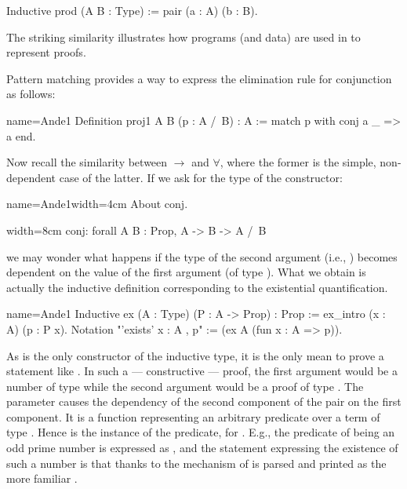 \begin{coq}{}{}
Inductive prod (A B : Type) := pair (a : A) (b : B).
\end{coq}
The striking similarity illustrates how programs (and data) are used in \Coq{}
to represent proofs.

Pattern matching provides a way to express the elimination rule for
conjunction as follows:

\begin{coq}{name=Ande1}{}
Definition proj1 A B (p : A /\ B) : A :=
  match p with conj a _ => a end.
\end{coq}

Now recall the similarity between $\to$ and $\forall$, where the former is the
simple, non-dependent case of the latter.  If we ask for the type of
the  constructor:

\begin{coq}{name=Ande1}{width=4cm}
About conj.
\end{coq}
\begin{coqout}{}{width=8cm}
conj: forall A B : Prop, A -> B -> A /\ B
\end{coqout}
we may wonder what happens if the type of the second argument (i.e., )
becomes dependent on the value of the first argument (of type ).
What we obtain is actually the inductive definition corresponding to the
existential quantification.

\begin{coq}{name=Ande1}{}
Inductive ex (A : Type) (P : A -> Prop) : Prop :=
  ex_intro (x : A) (p : P x).
Notation "'exists' x : A , p" := (ex A (fun x : A => p)).
\end{coq}

As   is the only constructor of the  inductive
type, it is the only mean to prove a statement like
.  In such a --- constructive --- proof, the first
argument would be a number
 of type  while the second argument would be a proof  of type
.  The parameter  causes the dependency of the
second component of the pair on the first component. It is a function
representing an arbitrary predicate over a term of
type .  Hence  is the instance of the predicate, for .  E.g.,
the predicate of being an odd prime number is expressed as
, and the statement expressing the
existence of such a number is
 that thanks
to the  mechanism of \Coq{} is parsed and
printed as the more familiar .

